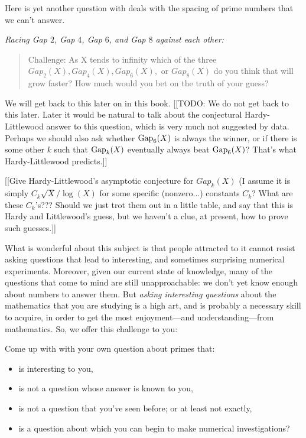 \documentclass[11pt]{article}
\theoremstyle{plain}
\theoremstyle{definition}
\numberwithin{equation}{section}
\numberwithin{figure}{section}
\numberwithin{table}{section}
\begin{document}
   \bigskip
   
   Here is yet another question with deals with
the spacing of prime numbers that we can't answer.
  
{\em Racing Gap $2$,  Gap $4$, Gap $6$, and Gap $8$ against each other:} 
  
\begin{quote}
  Challenge: As X tends to infinity which of the three $Gap_2(X),
  Gap_4(X), Gap_6(X),$ or $Gap_8(X)$ do you think that will grow
  faster? How much would you bet on the truth of your guess?
\end{quote}
  
We will get back to this later on in this book.  [[TODO: We do not get
back to this later.  Later it would be natural to talk about the
conjectural Hardy-Littlewood answer to this question, which is very
much not suggested by data.  Perhaps we should also
ask whether ${\rm Gap}_6(X)$ is always the winner, or if there is some
other $k$ such that ${\rm Gap}_k(X)$ eventually always beat ${\rm
  Gap}_6(X)$?  That's what Hardy-Littlewood predicts.]]

[[Give Hardy-Littlewood's asymptotic conjecture for $Gap_k(X)$ (I
assume it is simply $C_k{\sqrt X}/\log(X)$ for some specific
(nonzero...)  constants $C_k$? What are these $C_k$'s???  Should we
just trot them out in a little table, and say that this is Hardy and
Littlewood's guess, but we haven't a clue, at present, how to prove
such guesses.]]

What is wonderful about this subject is that people attracted to it
cannot resist asking questions that lead to interesting, and sometimes
surprising numerical experiments. Moreover, given our current state of
knowledge, many of the questions that come to mind are still
unapproachable: we don't yet know enough about numbers to answer them.
But {\it asking interesting questions} about the mathematics that you
are studying is a high art, and is probably a necessary skill to
acquire, in order to get the most enjoyment---and understanding---from
mathematics.  So, we offer this challenge to you:

Come up with with your own question about primes that:
 
 \begin{itemize}
 \item     is interesting to you,
  \item    is not a question whose answer is known to you,
 \item     is not a question that you've seen before; or at least not exactly,
  \item    is a question about which you can begin to make numerical investigations? 
 \end{itemize}
 
\end{document}
